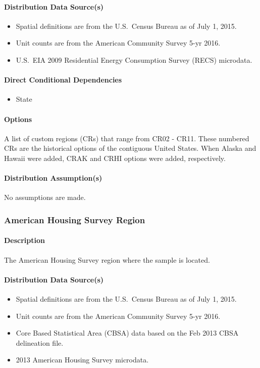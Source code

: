 \paragraph{Distribution Data Source(s)}
\begin{itemize}
    \item Spatial definitions are from the U.S.~Census Bureau as of July 1, 2015.
    \item Unit counts are from the American Community Survey 5-yr 2016.
    \item U.S.~EIA 2009 Residential Energy Consumption Survey (RECS) microdata.
\end{itemize}

\paragraph{Direct Conditional Dependencies}
\begin{itemize}
    \item State
\end{itemize}

\paragraph{Options}
A list of custom regions (CRs) that range from CR02 - CR11. These numbered CRs are the historical options of the contiguous United States. When Alaska and Hawaii were added, CRAK and CRHI options were added, respectively.

\paragraph{Distribution Assumption(s)}
No assumptions are made.

\subsubsection{American Housing Survey Region}
\paragraph{Description}
The American Housing Survey region where the sample is located.

\paragraph{Distribution Data Source(s)}
\begin{itemize}
    \item Spatial definitions are from the U.S.~Census Bureau as of July 1, 2015.
    \item Unit counts are from the American Community Survey 5-yr 2016.
    \item Core Based Statistical Area (CBSA) data based on the Feb 2013 CBSA delineation file.
    \item 2013 American Housing Survey microdata.
\end{itemize}

